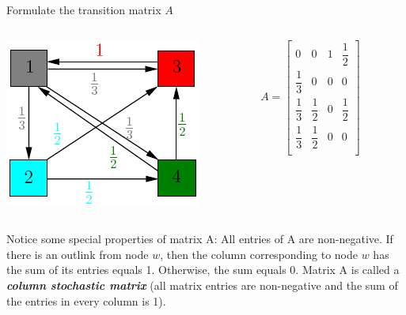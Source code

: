 \documentclass{beamer}
\begin{document}
\begin{frame}[t]{Formulate the transition matrix $A$}
    \begin{columns}
        \begin{column}{0.5\textwidth}
            \includegraphics[width=\textwidth]{weighted.png}
        \end{column}
        \begin{column}{0.5\textwidth}
            \bgroup
            \renewcommand*{\arraystretch}{2}
            \begin{math}
                A = \begin{bmatrix}
                    0 & 0 & 1 & \dfrac{1}{2}\\
                    \dfrac{1}{3} & 0 & 0 & 0\\
                    \dfrac{1}{3} & \dfrac{1}{2} & 0 & \dfrac{1}{2}\\
                    \dfrac{1}{3} & \dfrac{1}{2} & 0 & 0\\
                \end{bmatrix}
            \end{math}
            \egroup
        \end{column}
    \end{columns}
    \begin{outline}
        \1 Notice some special properties of matrix A: 
        \2 All entries of A are non-negative. 
        \2 If there is an outlink from node $w$, then the column  corresponding to node $w$ has the sum of its entries equals 1. Otherwise, the sum equals 0.
        \1  Matrix A is called a \textbf{\emph{column stochastic matrix}} (all matrix entries are non-negative and the sum of 
         the entries in every column is 1). 
    \end{outline}
\end{frame}
\end{document}
